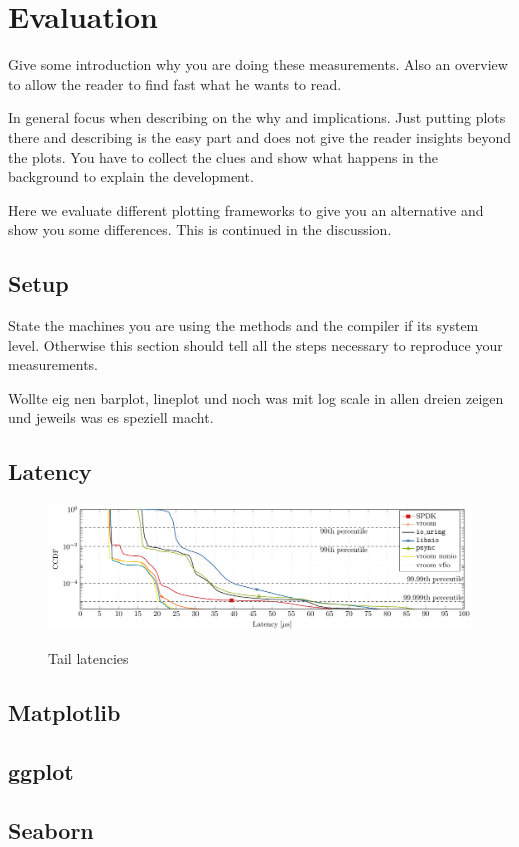 \chapter{Evaluation}
Give some introduction why you are doing these measurements.
Also an overview to allow the reader to find fast what he wants to read.

In general focus when describing on the why and implications.
Just putting plots there and describing is the easy part and does not give the reader insights beyond the plots.
You have to collect the clues and show what happens in the background to explain the development.

Here we evaluate different plotting frameworks to give you an alternative and show you some differences. This is continued in the discussion.

\section{Setup}
State the machines you are using the methods and the compiler if its system level.
Otherwise this section should tell all the steps necessary to reproduce your measurements.

Wollte eig nen barplot, lineplot und noch was mit log scale in allen dreien zeigen und jeweils was es speziell macht.


\section{Latency}
\begin{figure}
    \centering
     {\includegraphics[width=\textwidth]{figures/latency-ccdf-write} \label{fig:ccdf-write}}
    \caption{Tail latencies}
    \label{fig:ccdf}
\end{figure}

\section{Matplotlib}

\section{ggplot}

\section{Seaborn}
